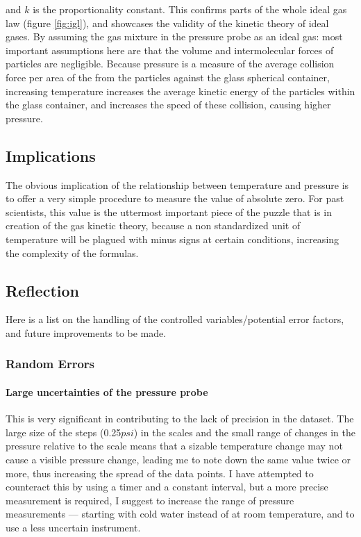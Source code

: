\documentclass[a4paper,12pt]{article}
\begin{document}
and $k$ is the proportionality constant. This confirms parts of the whole ideal gas law (figure \ref{fig:igl}), and showcases the validity of the kinetic theory of ideal gases.
By assuming the gas mixture in the pressure probe as an ideal gas: most important assumptions here are that the volume and intermolecular forces of particles are negligible. Because pressure is a measure of the average collision force per area of the from the particles against the glass spherical container, increasing temperature increases the average kinetic energy of the particles within the glass container, and increases the speed of these collision, causing higher pressure.

\subsection{Implications}
The obvious implication of the relationship between temperature and pressure is to offer a very simple procedure to measure the value of absolute zero. For past scientists, this value is the uttermost important piece of the puzzle that is in creation of the gas kinetic theory, because a non standardized unit of temperature will be plagued with minus signs at certain conditions, increasing the complexity of the formulas.

\subsection{Reflection}

Here is a list on the handling of the controlled variables/potential error factors, and future improvements to be made.

\subsubsection{Random Errors}
\paragraph{Large uncertainties of the pressure probe} This is very significant in contributing to the lack of precision in the dataset. The large size of the steps (0.25$\si{psi}$) in the scales and the small range of changes in the pressure relative to the scale means that a sizable temperature change may not cause a visible pressure change, leading me to note down the same value twice or more, thus increasing the spread of the data points. I have attempted to counteract this by using a timer and a constant interval, but a more precise measurement is required, I suggest to increase the range of pressure measurements --- starting with cold water instead of at room temperature, and to use a less uncertain instrument.
\end{document}
